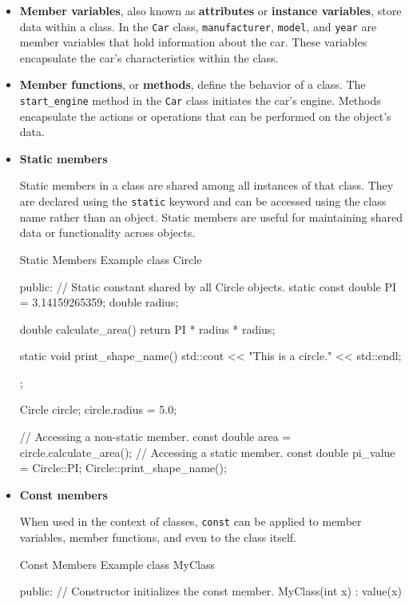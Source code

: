 \begin{itemize}
    \item \textbf{Member variables}, also known as \textbf{attributes} or \textbf{instance variables}, store data within a class. In the \texttt{Car} class, \texttt{manufacturer}, \texttt{model}, and \texttt{year} are member variables that hold information about the car. These variables encapsulate the car's characteristics within the class.
    \item \textbf{Member functions}, or \textbf{methods}, define the behavior of a class. The \texttt{start\_engine} method in the \texttt{Car} class initiates the car's engine. Methods encapsulate the actions or operations that can be performed on the object's data.
    \item \textbf{Static members}
    
    Static members in a class are shared among all instances of that class. They are declared using the \texttt{static} keyword and can be accessed using the class name rather than an object. Static members are useful for maintaining shared data or functionality across objects.
    
    \begin{neonlisting}[language=C++]{Static Members Example}
class Circle {
public:
    // Static constant shared by all Circle objects.
    static const double PI = 3.14159265359;
    double radius;

    double calculate_area() {
        return PI * radius * radius;
    }
    
    static void print_shape_name() {
        std::cout << "This is a circle." << std::endl;
    }
};

Circle circle;
circle.radius = 5.0;

// Accessing a non-static member.
const double area = circle.calculate_area();
// Accessing a static member.
const double pi_value = Circle::PI;
Circle::print_shape_name();
\end{neonlisting}
    
    \item \textbf{Const members}
    
    When used in the context of classes, \texttt{const} can be applied to member variables, member functions, and even to the class itself.
    
    \begin{neonlisting}[language=C++]{Const Members Example}
class MyClass {
public:
    // Constructor initializes the const member.
    MyClass(int x) : value(x) {}
        
}
\end{neonlisting}
\end{itemize}
